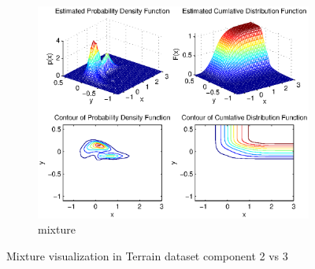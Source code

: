 \documentclass[14pt]{book}
\begin{document}
 \begin{figure}
        \centering
        \begin{subfigure}[b]{1.0\textwidth}
                \centering
                \includegraphics[width=\textwidth]{terrainDensity2vs3.eps}
                \caption{mixture }
                \label{fig:Mixture visualization in Terrain dataset component 2 vs 3}
        \end{subfigure}%

        \caption{Mixture visualization in Terrain dataset component 2 vs 3}\label{fig:animals}
\end{figure}
\end{document}
